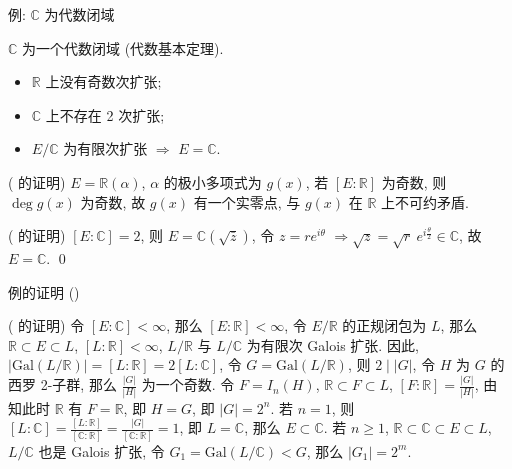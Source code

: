 
\begin{frame}{例: $\mathbb{C}$ 为代数闭域}

\begin{eg}
$\mathbb{C}$ 为一个代数闭域 (代数基本定理).
\begin{itemize}
\item {} $\mathbb{R}$ 上没有奇数次扩张;
\item {} $\mathbb{C}$ 上不存在 2 次扩张;
\item {} $E/\mathbb{C}$ 为有限次扩张 $\Longrightarrow$ $E = \mathbb{C}$.
\end{itemize}
\end{eg}

\startproof[bg=yellow, fg=red]( 的证明)
$E = \mathbb{R}(\alpha)$, $\alpha$ 的极小多项式为 $g(x)$,
若 $[E:\mathbb{R}]$ 为奇数,
则 $\deg g(x)$ 为奇数, 故 $g(x)$ 有一个实零点, 与 $g(x)$ 在 $\mathbb{R}$
上不可约矛盾.

\pause

\startproof[bg=yellow, fg=red]( 的证明)
$[E:\mathbb{C}] = 2$, 则 $E = \mathbb{C}(\sqrt{\bar{z}})$, 令 $z = r e^{i\theta}$
$\Longrightarrow \sqrt{z} = \sqrt{r}\ e^{i\frac{\theta}{2}} \in \mathbb{C}$, 故 $E = \mathbb{C}$.
\qed

\end{frame}


\begin{frame}{例的证明 (\texorpdfstring{}{3})}

\startproof[bg=yellow, fg=red]( 的证明)
令 $[E:\mathbb{C}] < \infty$, 那么 $[E:\mathbb{R}] < \infty$,
令 $E/\mathbb{R}$ 的正规闭包为 $L$,
那么 $\mathbb{R} \subset E \subset L$, $[L:\mathbb{R}] < \infty$,
$L/\mathbb{R}$ 与 $L/\mathbb{C}$ 为有限次 Galois 扩张.
因此, $|\mathrm{Gal}(L/\mathbb{R})| = [L:\mathbb{R}] = 2[L:\mathbb{C}]$,
令 $G = \mathrm{Gal}(L/\mathbb{R})$, 则 $2 \mid |G|$,
令 $H$ 为 $G$ 的西罗 2-子群,
那么 $\frac{|G|}{|H|}$ 为一个奇数. 令 $F = I_n(H)$, $\mathbb{R} \subset F \subset L$,
$[F:\mathbb{R}] = \frac{|G|}{|H|}$, 由  知此时 $\mathbb{R}$ 有 $F = \mathbb{R}$,
即 $H = G$, 即 $|G| = 2^n$.
若 $n = 1$, 则 $[L:\mathbb{C}] = \frac{[L:\mathbb{R}]}{[\mathbb{C}:\mathbb{R}]}
= \frac{|G|}{[\mathbb{C}:\mathbb{R}]} = 1$, 即 $L = \mathbb{C}$, 那么 $E \subset \mathbb{C}$.
若 $n \geq 1$, $\mathbb{R} \subset \mathbb{C} \subset E \subset L$,
$L/\mathbb{C}$ 也是 Galois 扩张,
令 $G_1 = \mathrm{Gal}(L/\mathbb{C}) < G$, 那么 $|G_1| = 2^m$.

\end{frame}

